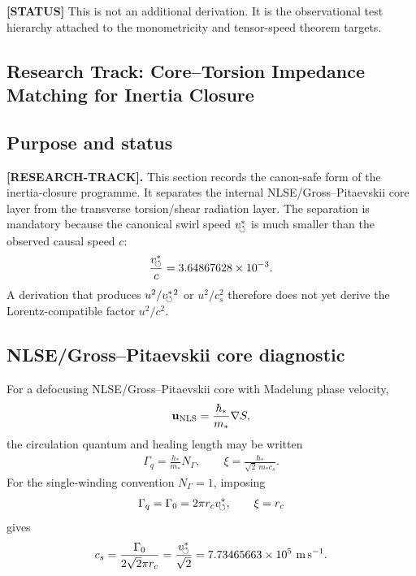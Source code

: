 \textbf{[STATUS]} This is not an additional derivation. It is the observational
test hierarchy attached to the monometricity and tensor-speed theorem targets.


\subsection{Research Track: Core--Torsion Impedance Matching for Inertia Closure}
\label{sec:rt_core_torsion_impedance_matching}

\subsection{Purpose and status}

\textbf{[RESEARCH-TRACK].}
This section records the canon-safe form of the inertia-closure programme. It separates the internal NLSE/Gross--Pitaevskii core layer from the transverse torsion/shear radiation layer. The separation is mandatory because the canonical swirl speed \(v_{\!\boldsymbol{\circlearrowleft}}^{\ast}\) is much smaller than the observed causal speed \(c\):
\begin{align}
    \frac{v_{\!\boldsymbol{\circlearrowleft}}^{\ast}}{c}=3.64867628\times10^{-3}.
\end{align}
A derivation that produces \(u^2/v_{\!\boldsymbol{\circlearrowleft}}^{\ast}{}^2\) or \(u^2/c_s^2\) therefore does not yet derive the Lorentz-compatible factor \(u^2/c^2\).

\subsection{NLSE/Gross--Pitaevskii core diagnostic}

For a defocusing NLSE/Gross--Pitaevskii core with Madelung phase velocity,
\begin{align}
    \mathbf u_{\rm NLS}=\frac{\hbar_*}{m_*}\nabla S,
\end{align}
the circulation quantum and healing length may be written
\begin{align}
    \Gamma_q = \frac{h_*}{m_*}N_\Gamma,
    \qquad
    \xi = \frac{\hbar_*}{\sqrt{2}\,m_*c_s}.
\end{align}
For the single-winding convention \(N_\Gamma=1\), imposing
\begin{align}
    \Gamma_q=\Gamma_0=2\pi r_cv_{\!\boldsymbol{\circlearrowleft}}^{\ast},
    \qquad
    \xi=r_c
\end{align}
gives
\begin{align}
    c_s
    =
    \frac{\Gamma_0}{2\sqrt{2}\pi r_c}
    =
    \frac{v_{\!\boldsymbol{\circlearrowleft}}^{\ast}}{\sqrt{2}}
    =
    7.73465663\times10^{5}\ \mathrm{m\,s^{-1}}.
    \label{eq:rt_core_torsion_cs}
\end{align}

